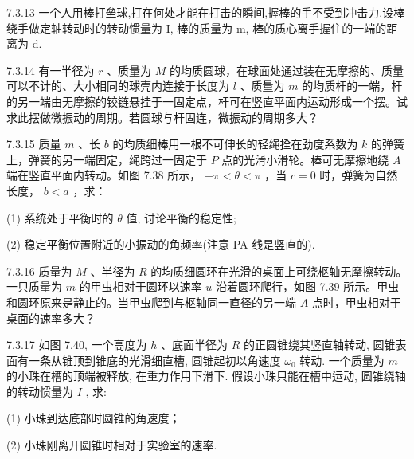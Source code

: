 \begin{problem}{7.3.13}
一个人用棒打垒球,打在何处才能在打击的瞬间,握棒的手不受到冲击力.设棒绕手做定轴转动时的转动惯量为 I, 棒的质量为 m, 棒的质心离手握住的一端的距离为 d.
\end{problem}
\clearpage


\begin{problem}{7.3.14}
有一半径为 $r$ 、质量为 $M$ 的均质圆球，在球面处通过装在无摩擦的、质量可以不计的、大小相同的球壳内连接于长度为 $l$ 、质量为 $m$ 的均质杆的一端，杆的另一端由无摩擦的铰链悬挂于一固定点，杆可在竖直平面内运动形成一个摆。试求此摆做微振动的周期。若圆球与杆固连，微振动的周期多大？
\end{problem}
\clearpage


\begin{problem}{7.3.15}
质量 $m$ 、长 $b$ 的均质细棒用一根不可伸长的轻绳拴在劲度系数为 $k$ 的弹簧上，弹簧的另一端固定，绳跨过一固定于 $P$ 点的光滑小滑轮。棒可无摩擦地绕 $A$ 端在竖直平面内转动。如图 7.38 所示， $-\pi < \theta < \pi$ ，当 $c = 0$ 时，弹簧为自然长度， $b < a$ ，求：

(1) 系统处于平衡时的 $\theta$ 值, 讨论平衡的稳定性;

(2) 稳定平衡位置附近的小振动的角频率(注意 PA 线是竖直的).
\begin{center}

\end{center}
\end{problem}
\clearpage


\begin{problem}{7.3.16}
质量为 $M$ 、半径为 $R$ 的均质细圆环在光滑的桌面上可绕枢轴无摩擦转动。一只质量为 $m$ 的甲虫相对于圆环以速率 $u$ 沿着圆环爬行，如图 7.39 所示。甲虫和圆环原来是静止的。当甲虫爬到与枢轴同一直径的另一端 $A$ 点时，甲虫相对于桌面的速率多大？
\begin{center}

\end{center}
\end{problem}
\clearpage


\begin{problem}{7.3.17}
如图 7.40, 一个高度为 $h$ 、底面半径为 $R$ 的正圆锥绕其竖直轴转动, 圆锥表面有一条从锥顶到锥底的光滑细直槽, 圆锥起初以角速度 $\omega_0$ 转动. 一个质量为 $m$ 的小珠在槽的顶端被释放, 在重力作用下滑下. 假设小珠只能在槽中运动, 圆锥绕轴的转动惯量为 $I$ , 求:

(1) 小珠到达底部时圆锥的角速度；

(2) 小珠刚离开圆锥时相对于实验室的速率.
\begin{center}

\end{center}
\end{problem}
\clearpage


